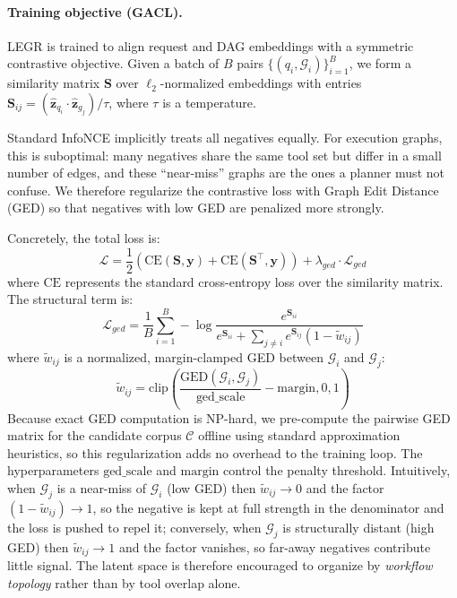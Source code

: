 \documentclass{article}
\begin{document}
\paragraph{Training objective (GACL).} LEGR is trained to align request and DAG embeddings with a symmetric contrastive objective. Given a batch of $B$ pairs $\{(q_i, \mathcal{G}_i)\}_{i=1}^B$, we form a similarity matrix $\mathbf{S}$ over $\ell_2$-normalized embeddings with entries $\mathbf{S}_{ij} = (\hat{\mathbf{z}}_{q_i} \cdot \hat{\mathbf{z}}_{g_j}) / \tau$, where $\tau$ is a temperature.

Standard InfoNCE implicitly treats all negatives equally. For execution graphs, this is suboptimal: many negatives share the same tool set but differ in a small number of edges, and these ``near-miss'' graphs are the ones a planner must not confuse. We therefore regularize the contrastive loss with Graph Edit Distance (GED) so that negatives with low GED are penalized more strongly.

Concretely, the total loss is:
\begin{equation}
\mathcal{L} = \frac{1}{2} \left( \text{CE}(\mathbf{S}, \mathbf{y}) + \text{CE}(\mathbf{S}^\top, \mathbf{y}) \right) + \lambda_{ged} \cdot \mathcal{L}_{ged}
\end{equation}
where $\text{CE}$ represents the standard cross-entropy loss over the similarity matrix. The structural term is:
\begin{equation}
\mathcal{L}_{ged} = \frac{1}{B} \sum_{i=1}^B -\log \frac{e^{\mathbf{S}_{ii}}}{e^{\mathbf{S}_{ii}} + \sum_{j \neq i} e^{\mathbf{S}_{ij}}(1 - \tilde{w}_{ij})}
\end{equation}
where $\tilde{w}_{ij}$ is a normalized, margin-clamped GED between $\mathcal{G}_i$ and $\mathcal{G}_j$:
\begin{equation}
\tilde{w}_{ij} = \text{clip} \left( \frac{\text{GED}(\mathcal{G}_i, \mathcal{G}_j)}{\text{ged\_scale}} - \text{margin}, 0, 1 \right)
\end{equation}
Because exact GED computation is NP-hard, we pre-compute the pairwise GED matrix for the candidate corpus $\mathcal{C}$ offline using standard approximation heuristics, so this regularization adds no overhead to the training loop. The hyperparameters $\text{ged\_scale}$ and $\text{margin}$ control the penalty threshold. Intuitively, when $\mathcal{G}_j$ is a near-miss of $\mathcal{G}_i$ (low GED) then $\tilde{w}_{ij} \to 0$ and the factor $(1-\tilde{w}_{ij}) \to 1$, so the negative is kept at full strength in the denominator and the loss is pushed to repel it; conversely, when $\mathcal{G}_j$ is structurally distant (high GED) then $\tilde{w}_{ij} \to 1$ and the factor vanishes, so far-away negatives contribute little signal. The latent space is therefore encouraged to organize by \emph{workflow topology} rather than by tool overlap alone.
\end{document}
